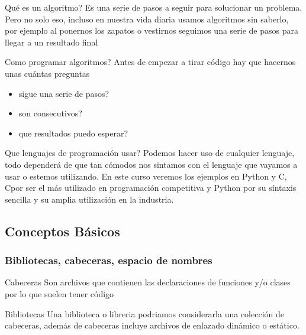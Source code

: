 \documentclass{beamer}
\newcommand{\Rplus}{\protect\hspace{-.1em}\protect\raisebox{.35ex}{\smaller{\smaller\textbf{+}}}}
\newcommand{\Cpp}{\mbox{C\Rplus\Rplus}\hspace{3pt}}
\begin{document}
\begin{frame}{\textquestiondown Qué es un algoritmo?}
Es una serie de pasos a seguir para solucionar un problema.\newline
Pero no solo eso, incluso en nuestra vida diaria usamos algoritmos sin saberlo, por ejemplo al ponernos los zapatos o vestirnos seguimos una serie de pasos para llegar a un resultado final
\end{frame}

\begin{frame}{\textquestiondown Como programar algoritmos?}
Antes de empezar a tirar código hay que hacernos unas cu\'antas preguntas
    \begin{itemize}
        \item \textquestiondown sigue una serie de pasos?
        \item \textquestiondown son consecutivos?
        \item \textquestiondown que resultados puedo esperar?
    \end{itemize}
\end{frame}

\begin{frame}{\textquestiondown Que lenguajes de programaci\'on usar?}
Podemos hacer uso de cualquier lenguaje, todo depender\'a de que tan c\'omodos nos sintamos con el lenguaje
que vayamos a usar o estemos utilizando.\newline
En este curso veremos los ejemplos en Python y \Cpp, \Cpp por ser el m\'as utilizado en programaci\'on competitiva y Python por su s\'intaxis sencilla y su amplia utilizaci\'on en la industria.
\end{frame}

\subsection{Conceptos B\'asicos}

\subsubsection{Bibliotecas, cabeceras, espacio de nombres}

\begin{frame}{Cabeceras}
        Son archivos que contienen las declaraciones de funciones y/o clases por lo que suelen tener c\'odigo
\end{frame}

\begin{frame}{Bibliotecas}
    Una biblioteca o libreria podriamos considerarla una colecci\'on de cabeceras, adem\'as de cabeceras incluye archivos de enlazado din\'amico o est\'atico.
\end{frame}
\end{document}
